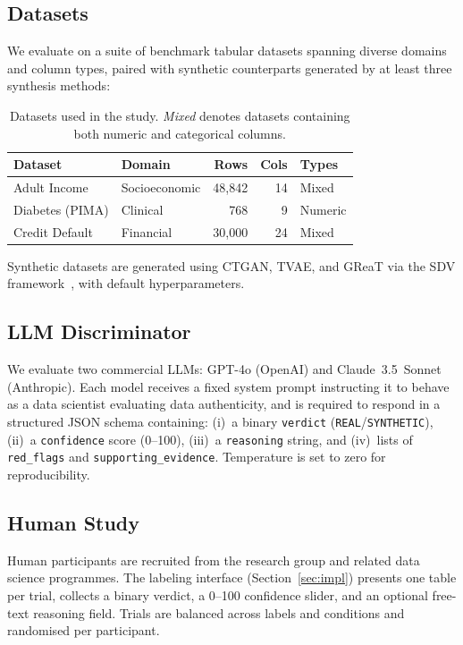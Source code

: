 \documentclass[runningheads]{llncs}
\begin{document}
\subsection{Datasets}

We evaluate on a suite of benchmark tabular datasets spanning diverse
domains and column types, paired with synthetic counterparts generated
by at least three synthesis methods:

\begin{table}[ht]
\centering
\caption{Datasets used in the study. \emph{Mixed} denotes datasets
containing both numeric and categorical columns.}
\label{tab:datasets}
\begin{tabular}{llrrl}
\toprule
\textbf{Dataset} & \textbf{Domain} & \textbf{Rows} & \textbf{Cols} & \textbf{Types} \\
\midrule
Adult Income     & Socioeconomic   & 48,842 & 14  & Mixed \\
Diabetes (PIMA)  & Clinical        & 768    & 9   & Numeric \\
Credit Default   & Financial       & 30,000 & 24  & Mixed \\
\bottomrule
\end{tabular}
\end{table}

Synthetic datasets are generated using CTGAN, TVAE, and GReaT via the
SDV framework~\cite{patki2016synthetic}, with default hyperparameters.

\subsection{LLM Discriminator}

We evaluate two commercial LLMs: GPT-4o (OpenAI) and Claude~3.5~Sonnet
(Anthropic).
Each model receives a fixed system prompt instructing it to behave as a
data scientist evaluating data authenticity, and is required to respond
in a structured JSON schema containing:
(i)~a binary \texttt{verdict} (\texttt{REAL}/\texttt{SYNTHETIC}),
(ii)~a \texttt{confidence} score (0--100),
(iii)~a \texttt{reasoning} string, and
(iv)~lists of \texttt{red\_flags} and \texttt{supporting\_evidence}.
Temperature is set to zero for reproducibility.

\subsection{Human Study}

Human participants are recruited from the research group and related
data science programmes.
The labeling interface (Section~\ref{sec:impl}) presents one table per
trial, collects a binary verdict, a 0--100 confidence slider, and an
optional free-text reasoning field.
Trials are balanced across labels and conditions and randomised per
participant.
\end{document}
